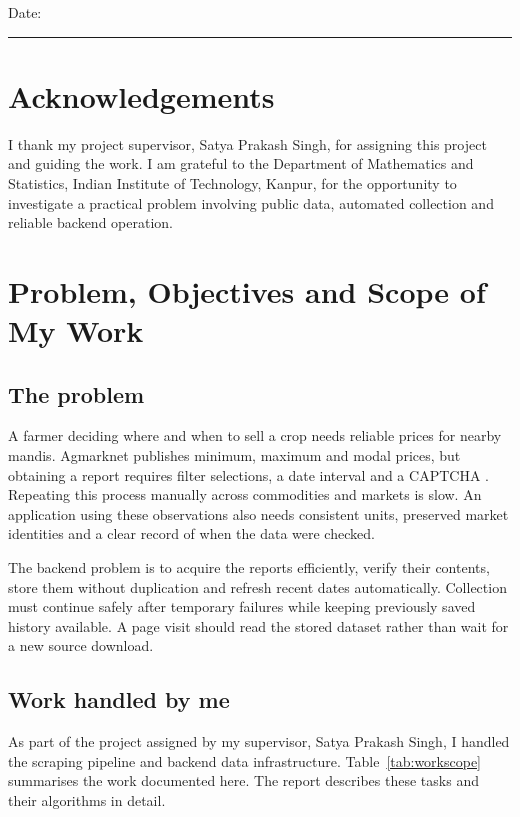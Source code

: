 \documentclass[12pt,a4paper,oneside]{report}
\newcommand{\supervisor}{Satya Prakash Singh}
\newcommand{\department}{Department of Mathematics and Statistics}
\newcommand{\institution}{Indian Institute of Technology, Kanpur}
\numberwithin{equation}{chapter}
\numberwithin{figure}{chapter}
\numberwithin{table}{chapter}
\theoremstyle{definition}
\begin{document}
\noindent Date: \rule{4cm}{0.4pt}

\clearpage
\chapter*{Acknowledgements}
I thank my project supervisor, \supervisor, for assigning this project and guiding the work. I am grateful to the \department, \institution, for the opportunity to investigate a practical problem involving public data, automated collection and reliable backend operation.

\clearpage
{}
\setcounter{page}{1}

\chapter{Problem, Objectives and Scope of My Work}

\section{The problem}
A farmer deciding where and when to sell a crop needs reliable prices for nearby mandis. Agmarknet publishes minimum, maximum and modal prices, but obtaining a report requires filter selections, a date interval and a CAPTCHA \cite{agmarknet}. Repeating this process manually across commodities and markets is slow. An application using these observations also needs consistent units, preserved market identities and a clear record of when the data were checked.

The backend problem is to acquire the reports efficiently, verify their contents, store them without duplication and refresh recent dates automatically. Collection must continue safely after temporary failures while keeping previously saved history available. A page visit should read the stored dataset rather than wait for a new source download.

\section{Work handled by me}
As part of the project assigned by my supervisor, \supervisor, I handled the scraping pipeline and backend data infrastructure. Table~\ref{tab:workscope} summarises the work documented here. The report describes these tasks and their algorithms in detail.
\end{document}
